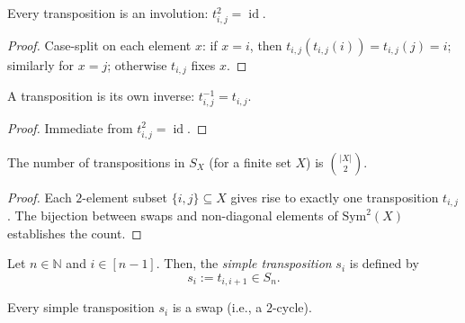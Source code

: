 \begin{lemma}
\label{lem.perm.tij.sq}
\leanhelper
\leanok
Every transposition is an involution: $t_{i,j}^2 = \operatorname{id}$.
\end{lemma}

\begin{proof}
\leanok
Case-split on each element $x$: if $x = i$, then $t_{i,j}(t_{i,j}(i)) = t_{i,j}(j) = i$; similarly for $x = j$; otherwise $t_{i,j}$ fixes $x$.
\end{proof}

\begin{lemma}
\label{lem.perm.tij.inv}
\leanhelper
\leanok
A transposition is its own inverse: $t_{i,j}^{-1} = t_{i,j}$.
\end{lemma}

\begin{proof}
\leanok
Immediate from $t_{i,j}^2 = \operatorname{id}$.
\end{proof}

\begin{lemma}
\label{lem.num_transpositions}
\leanhelper
\leanok
The number of transpositions in $S_X$ (for a finite set $X$)
is $\binom{|X|}{2}$.
\end{lemma}

\begin{proof}
\leanok
Each $2$-element subset $\{i,j\} \subseteq X$ gives rise to exactly one
transposition $t_{i,j}$.  The bijection between swaps and non-diagonal elements
of $\mathrm{Sym}^2(X)$ establishes the count.
\end{proof}

\begin{definition}
\label{def.perm.si}
\leantarget
\leanok
Let $n \in \mathbb{N}$ and $i \in [n-1]$. Then, the \emph{simple transposition}
$s_i$ is defined by
\[
s_i := t_{i, i+1} \in S_n.
\]
\end{definition}

\begin{lemma}
\label{lem.perm.si.isSwap}
\leanhelper
\leanok
Every simple transposition $s_i$ is a swap (i.e., a $2$-cycle).
\end{lemma}

